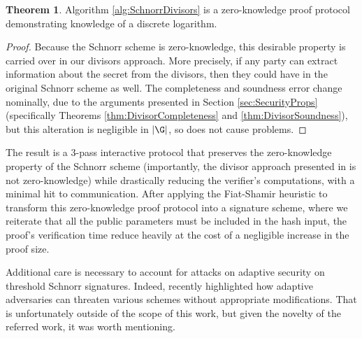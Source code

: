 \documentclass[11pt,letterpaper]{article}
\theoremstyle{definition}
\newtheorem{theorem}{Theorem}[subsection]
\newcommand{\6}{\mathbf}
\newcommand{\7}{\mathcal}
\begin{document}
\begin{theorem}
    Algorithm \ref{alg:SchnorrDivisors} is a zero-knowledge proof protocol demonstrating knowledge of a discrete logarithm.
\end{theorem}
\begin{proof}
    Because the Schnorr scheme is zero-knowledge, this desirable property is carried over in our divisors approach. 
    More precisely, if any party can extract information about the secret from the divisors, then they could have in the original Schnorr scheme as well.
    The completeness and soundness error change nominally, due to the arguments presented in Section \ref{sec:SecurityProps} (specifically Theorems \ref{thm:DivisorCompleteness} and \ref{thm:DivisorSoundness}), but this alteration is negligible in $|\G|$, so does not cause problems.
\end{proof}

The result is a $3$-pass interactive protocol that preserves the zero-knowledge property of the Schnorr scheme (importantly, the divisor approach presented in \cite{SoundnessForDLP} is not zero-knowledge) while drastically reducing the verifier's computations, with a minimal hit to communication.
After applying the Fiat-Shamir heuristic to transform this zero-knowledge proof protocol into a signature scheme, where we reiterate that all the public parameters must be included in the hash input, the proof's verification time reduce heavily at the cost of a negligible increase in the proof size.

Additional care is necessary to account for attacks on adaptive security on threshold Schnorr signatures. Indeed, \cite{PlausibleAttack} recently highlighted how adaptive adversaries can threaten various schemes without appropriate modifications. That is unfortunately outside of the scope of this work, but given the novelty of the referred work, it was worth mentioning.
\end{document}
